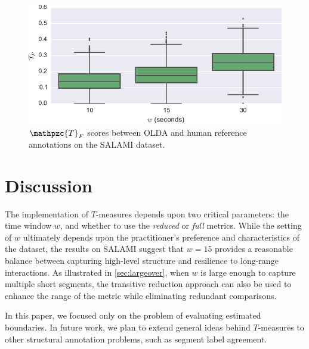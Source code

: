 \documentclass{article}
\def\shag{\ensuremath{\mathpzc{T}}}
\begin{document}
\begin{figure}[t]
    \centering
    \includegraphics[width=\columnwidth]{figs/salami-olda-stats}
    \caption{$\shag_F$ scores between OLDA and human reference annotations on the SALAMI dataset.}
    \label{fig:salami-olda-stats}
\end{figure}



\section{Discussion}\label{sec:conclusions}

The implementation of $T$-measures depends upon two critical parameters: the time window
$w$, and whether to use the \emph{reduced} or \emph{full} metrics.  While the setting of
$w$ ultimately depends upon the practitioner's preference and characteristics of the
dataset, the results on SALAMI suggest that $w=15$ provides a reasonable balance
between capturing high-level structure and resilience to long-range interactions.
As illustrated in \cref{sec:largeover}, when $w$ is large enough to capture multiple short
segments, the transitive reduction approach can also be used to enhance the range
of the metric while eliminating redundant comparisons.

In this paper, we focused only on the problem of evaluating estimated boundaries.
In future work, we plan to extend general ideas behind $T$-measures to other structural 
annotation problems, such as segment label agreement.


\end{document}
